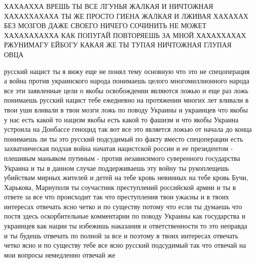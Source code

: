ХАХААХХА ВРЕШЬ ТЫ ВСЕ ЛГУНЬЯ ЖАЛКАЯ И НИЧТОЖНАЯ ХАХАХХАХАХА ТЫ ЖЕ ПРОСТО ГИЕНА
ЖАЛКАЯ И ЛЖИВАЯ ХАХАХАХ БЕЗ МОЗГОВ ДАЖЕ СВОЕГО НИЧЕГО СОЧИНИТЬ НЕ МОЖЕТ
ХАХАХАХАХХА КАК ПОПУГАЙ ПОВТОРЯЕШЬ ЗА МНОЙ ХАХАХХАХАХ РЖУНИМАГУ ЕЙБОГУ КАКАЯ ЖЕ
ТЫ ТУПАЯ НИЧТОЖНАЯ ГЛУПАЯ ОВЦА

русский нацист ты я вижу еще не понял тему основную что это не спецоперация а
война против украинского народа понимаешь целого многомиллионного народа все
эти заявленные цели о якобы освобождении являются ложью и еще раз ложь
понимаешь русский нацист тебе ежедневно на протяжении многих лет вливали в твои
уши вливали в твои мозги ложь по поводу Украины и украинцев что якобы у нас
есть какой то нацизм якобы есть какой то фашизм и что якобы Украина устроила на
Донбассе геноцид так вот все это является ложью от начала до конца понимаешь ли
ты это русский подсудимый по факту вместо спецоперации есть захватническая
подлая война начатая нацистской россии и ее президентом - плешивым маньяком
путиным - против независимого суверенного государства Украина и ты в данном
случае поддерживаешь эту войну ты рукоплещешь убийствам мирных жителей и детей
на тебе кровь невинных на тебе кровь Бучи, Харькова, Мариуполя ты соучастник
преступлений российской армии и ты в ответе за все что происходит так что
преступления твои ужасны и в твоих интересах отвечать ясно четко и по существу
потому что если ты думаешь что постя здесь оскорбительные комментарии по поводу
Украины как государства и украинцев как нации ты избежишь наказания и
ответственности то это неправда и ты будешь отвечать по полной за все и поэтому
в твоих интересах отвечать четко ясно и по существу тебе все ясно русский
подсудимый так что отвечай на мои вопросы немедленно отвечай же

